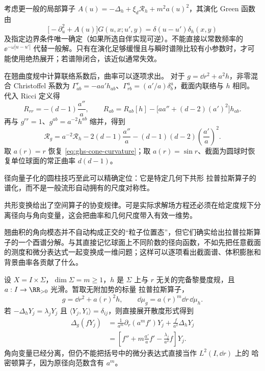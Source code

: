 考虑更一般的局部算子 $A(u)=-\Delta_h+\xi_d\mathcal R_h+m^2a(u)^2$，其演化 Green 函数由
\begin{equation}\label{eq:ghs-variable-cylinder-propagation}
 \bigl[-\partial_u^2+A(u)\bigr]G(u,x;u',y)
 =\delta(u-u')\delta_h(x,y)
\end{equation}
及指定边界条件唯一确定（如果所选自伴实现可逆）。不能直接以常数频率的 $\ee^{-\omega|u-u'|}$ 代替一般解。只有在演化足够缓慢且与瞬时谱隙比较有小参数时，才可能使用绝热展开；若谱隙闭合，该近似通常失效。

在翘曲度规中计算联络系数后，曲率可以逐项求出。
对于 $g=\dd r^2+a^2h$，非零混合 Christoffel 系数为 $\Gamma^r_{ab}=-aa'h_{ab}$、$\Gamma^a_{rb}=(a'/a)\delta^a_b$，截面内联络与 $h$ 相同。代入 Ricci 定义得
\[
 R_{rr}=-(d-1)\frac{a''}a,\qquad
 R_{ab}=R_{ab}[h]-\bigl[aa''+(d-2)(a')^2\bigr]h_{ab}.
\]
再与 $g^{rr}=1$、$g^{ab}=a^{-2}h^{ab}$ 缩并，得到
\begin{equation}\label{eq:ghs-warped-scalar-curvature}
 \mathcal R_g=a^{-2}\mathcal R_h
 -2(d-1)\frac{a''}a-(d-1)(d-2)\left(\frac{a'}a\right)^2.
\end{equation}
取 $a(r)=r$ 恢复 \cref{eq:ghs-cone-curvature}；取 $a(r)=\sin r$、截面为圆球时恢复单位球面的常正曲率 $d(d-1)$。

径向量子化的圆柱技巧至此可以精确定位：它是特定几何下共形 拉普拉斯算子的谱化，而不是一般流形自动拥有的尺度对称性。

共形变换给出了空间算子的协变规律。可是实际求解场方程还必须在给定度规下分离径向与角向变量，这会把曲率和几何尺度带入有效一维势。

翘曲积的角向模态并不自动构成正交的“粒子位置态”，但它们确实给出拉普拉斯算子的一个酉谱分解。与其直接记忆球面上不同阶数的径向函数，不如先把任意截面的测度和微分表达式一起变换成一维问题；这样可以逐项看出截面谱、体积膨胀和背景曲率各贡献了什么。

设 $X=I\times\Sigma$，$\dim\Sigma=m\ge1$，$h$ 是 $\Sigma$ 上与 $r$ 无关的完备黎曼度规，且 $a:I\to\RR_{>0}$ 光滑。暂取无附加势的标量 拉普拉斯算子，
\begin{equation}\label{eq:ghs-r9-warp-geometry}
 g=\dd r^2+a(r)^2h,\qquad \dd\mu_g=a(r)^m\dd r\,\dd\mu_h.
\end{equation}
若 $-\Delta_hY_j=\lambda_jY_j$ 且 $\langle Y_j, Y_i\rangle=\delta_{ij}$，则直接展开散度形式得到
\begin{align*}
\Delta_g(fY_j)
 &=\frac1{a^m}\partial_r(a^m f')Y_j+\frac{f}{a^2}\Delta_hY_j\\
 &=\left[f''+m\frac{a'}a f'-\frac{\lambda_j}{a^2}f\right]Y_j.
\end{align*}
角向变量已经分离，但仍不能把括号中的微分表达式直接当作 $L^2(I,\dd r)$ 上的 哈密顿算子，因为原径向范数含有 $a^m$。

